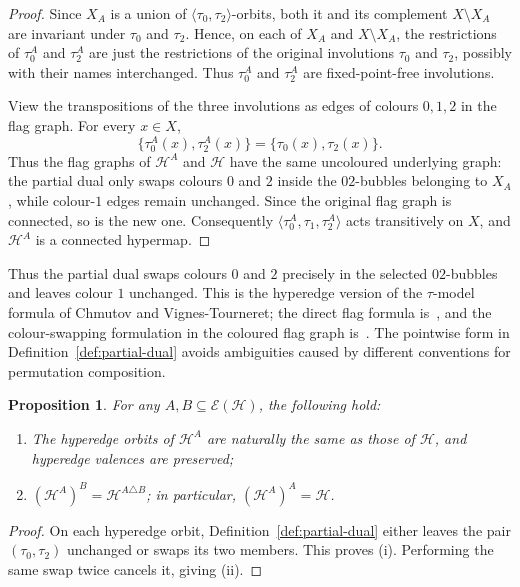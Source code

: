 \documentclass[10pt,a4paper]{article}
\newtheorem{proposition}[theorem]{Proposition}
\theoremstyle{definition}
\theoremstyle{remark}
\newcommand{\Hcal}{\mathcal{H}}
\newcommand{\Ecal}{\mathcal{E}}
\begin{document}
\begin{proof}
Since $X_A$ is a union of $\langle\tau_0,\tau_2\rangle$-orbits, both it and its complement $X\setminus X_A$ are invariant under $\tau_0$ and $\tau_2$. Hence, on each of $X_A$ and $X\setminus X_A$, the restrictions of $\tau_0^A$ and $\tau_2^A$ are just the restrictions of the original involutions $\tau_0$ and $\tau_2$, possibly with their names interchanged. Thus $\tau_0^A$ and $\tau_2^A$ are fixed-point-free involutions.

View the transpositions of the three involutions as edges of colours $0,1,2$ in the flag graph. For every $x\in X$,
\[
 \bigl\{\tau_0^A(x),\tau_2^A(x)\bigr\}
 =
 \bigl\{\tau_0(x),\tau_2(x)\bigr\}.
\]
Thus the flag graphs of $\Hcal^A$ and $\Hcal$ have the same uncoloured underlying graph: the partial dual only swaps colours $0$ and $2$ inside the $02$-bubbles belonging to $X_A$, while colour-$1$ edges remain unchanged. Since the original flag graph is connected, so is the new one. Consequently $\langle\tau_0^A,\tau_1,\tau_2^A\rangle$ acts transitively on $X$, and $\Hcal^A$ is a connected hypermap.
\end{proof}

Thus the partial dual swaps colours $0$ and $2$ precisely in the selected $02$-bubbles and leaves colour $1$ unchanged. This is the hyperedge version of the $\tau$-model formula of Chmutov and Vignes-Tourneret; the direct flag formula is~\cite[Theorem~2.6]{ChmutovVignes2022}, and the colour-swapping formulation in the coloured flag graph is~\cite[Theorem~2.8]{ChmutovVignes2022}. The pointwise form in Definition~\ref{def:partial-dual} avoids ambiguities caused by different conventions for permutation composition.

\begin{proposition}\label{prop:basic-pd}
For any $A,B\subseteq\Ecal(\Hcal)$, the following hold:
\begin{enumerate}[label=\textup{(\roman*)}]
\item The hyperedge orbits of $\Hcal^A$ are naturally the same as those of $\Hcal$, and hyperedge valences are preserved;
\item $(\Hcal^A)^B=\Hcal^{A\triangle B}$; in particular, $(\Hcal^A)^A=\Hcal$.
\end{enumerate}
\end{proposition}

\begin{proof}
On each hyperedge orbit, Definition~\ref{def:partial-dual} either leaves the pair $(\tau_0,\tau_2)$ unchanged or swaps its two members. This proves (i). Performing the same swap twice cancels it, giving (ii).
\end{proof}
\end{document}

